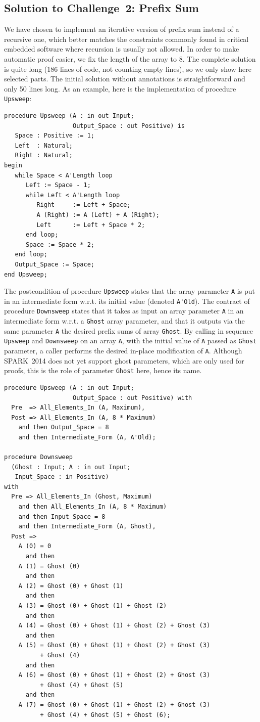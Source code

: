 \documentclass[sttt,final]{svjour}
\newcommand{\newspark}{SPARK~2014\xspace}
\newcommand{\wrt}{w.r.t.\xspace}
\begin{document}
\subsection{Solution to Challenge~2: Prefix Sum}
\label{solution2}
We have chosen to implement an iterative version of prefix sum
instead of a recursive one, which better matches the constraints
commonly found in critical embedded software where recursion is
usually not allowed. In order to make automatic proof easier, we fix
the length of the array to 8. The complete solution is quite long (186
lines of code, not counting empty lines), so we only show here
selected parts. The initial solution without annotations is
straightforward and only 50 lines long. As an example, here is the
implementation of procedure \verb|Upsweep|:
%
\begin{lstlisting}
procedure Upsweep (A : in out Input;
                   Output_Space : out Positive) is
   Space : Positive := 1;
   Left  : Natural;
   Right : Natural;
begin
   while Space < A'Length loop
      Left := Space - 1;
      while Left < A'Length loop
         Right     := Left + Space;
         A (Right) := A (Left) + A (Right);
         Left      := Left + Space * 2;
      end loop;
      Space := Space * 2;
   end loop;
   Output_Space := Space;
end Upsweep;
\end{lstlisting}
%
The postcondition of procedure \verb|Upsweep| states that the array
parameter \verb|A| is put in an intermediate form \wrt its initial
value (denoted \verb|A'Old|). The contract of procedure
\verb|Downsweep| states that it takes as input an array parameter
\verb|A| in an intermediate form \wrt a \verb|Ghost| array parameter,
and that it outputs via the same parameter \verb|A| the desired prefix
sums of array \verb|Ghost|. By calling in sequence \verb|Upsweep| and
\verb|Downsweep| on an array \verb|A|, with the initial value of
\verb|A| passed as \verb|Ghost| parameter, a caller performs the
desired in-place modification of \verb|A|. Although \newspark does not
yet support ghost parameters, which are only used for proofs, this is
the role of parameter \verb|Ghost| here, hence its name.
%
\begin{lstlisting}
procedure Upsweep (A : in out Input;
                   Output_Space : out Positive) with
  Pre  => All_Elements_In (A, Maximum),
  Post => All_Elements_In (A, 8 * Maximum)
    and then Output_Space = 8
    and then Intermediate_Form (A, A'Old);

procedure Downsweep
  (Ghost : Input; A : in out Input;
   Input_Space : in Positive)
with
  Pre => All_Elements_In (Ghost, Maximum)
    and then All_Elements_In (A, 8 * Maximum)
    and then Input_Space = 8
    and then Intermediate_Form (A, Ghost),
  Post =>
    A (0) = 0
      and then
    A (1) = Ghost (0)
      and then
    A (2) = Ghost (0) + Ghost (1)
      and then
    A (3) = Ghost (0) + Ghost (1) + Ghost (2)
      and then
    A (4) = Ghost (0) + Ghost (1) + Ghost (2) + Ghost (3)
      and then
    A (5) = Ghost (0) + Ghost (1) + Ghost (2) + Ghost (3)
          + Ghost (4)
      and then
    A (6) = Ghost (0) + Ghost (1) + Ghost (2) + Ghost (3)
          + Ghost (4) + Ghost (5)
      and then
    A (7) = Ghost (0) + Ghost (1) + Ghost (2) + Ghost (3)
          + Ghost (4) + Ghost (5) + Ghost (6);
\end{lstlisting}
\end{document}
